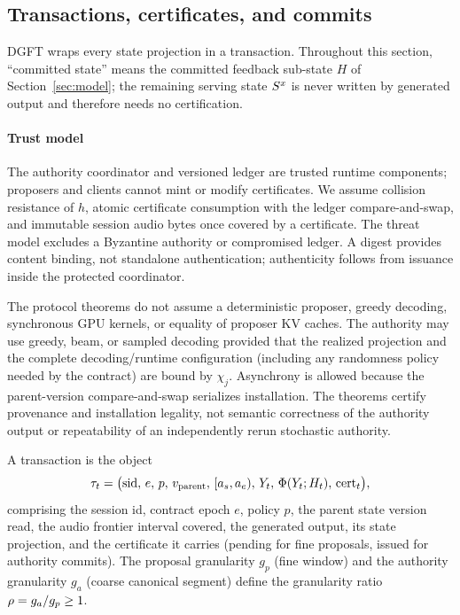 
\subsection{Transactions, certificates, and commits}\label{sec:dgft:tx}

DGFT wraps every state projection in a transaction. Throughout this section,
``committed state'' means the committed feedback sub-state $H$ of
Section~\ref{sec:model}; the remaining serving state $S^{x}$ is never
written by generated output and therefore needs no certification.

\paragraph{Trust model}
The authority coordinator and versioned ledger are trusted runtime
components; proposers and clients cannot mint or modify certificates. We
assume collision resistance of $h$, atomic certificate consumption with the
ledger compare-and-swap, and immutable session audio bytes once covered by a
certificate. The threat model excludes a Byzantine authority or compromised
ledger. A digest provides content binding, not standalone authentication;
authenticity follows from issuance inside the protected coordinator.

The protocol theorems do not assume a deterministic proposer, greedy
decoding, synchronous GPU kernels, or equality of proposer KV caches. The
authority may use greedy, beam, or sampled decoding provided that the realized
projection and the complete decoding/runtime configuration (including any
randomness policy needed by the contract) are bound by $\chi_j$. Asynchrony is
allowed because the parent-version compare-and-swap serializes installation.
The theorems certify provenance and installation legality, not semantic
correctness of the authority output or repeatability of an independently
rerun stochastic authority.

\begin{definition}\label{def:tx}
A transaction is the object
\[
  \tau_t = \bigl(\mathrm{sid},\, e,\, p,\, v_{\mathrm{parent}},\,
  [a_s,a_e),\, Y_t,\, \Phi(Y_t;H_t),\, \mathrm{cert}_t\bigr),
\]
comprising the session id, contract epoch $e$, policy $p$, the parent state
version read, the audio frontier interval covered, the generated output,
its state projection, and the certificate it carries (pending for fine
proposals, issued for authority commits). The proposal granularity
$g_p$ (fine window) and the authority granularity $g_a$ (coarse canonical
segment) define the granularity ratio $\rho = g_a/g_p \ge 1$.
\end{definition}

